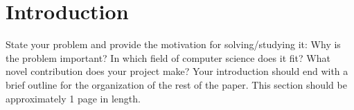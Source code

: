 

\section{Introduction}

State your problem and provide the motivation for solving/studying it: Why is
the problem important? In which field of computer science does it fit?  What
novel contribution does your project make? Your introduction should end with a
brief outline for the organization of the rest of the paper. This section
should be approximately 1 page in length.